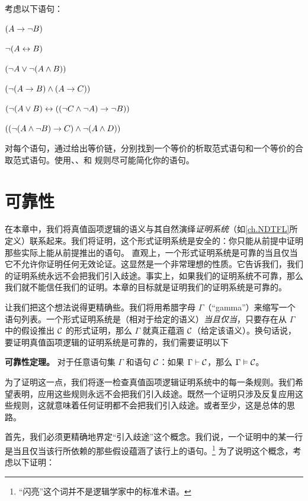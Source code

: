\practiceproblems
\problempart
\label{pr.DNF2}
考虑以下语句：


\begin{compactlist}
	\item $(A \rightarrow \neg B)$
	\item $\neg (A \leftrightarrow B)$
	\item $(\neg A \vee \neg (A \wedge B))$
	\item $(\neg (A \rightarrow B ) \wedge (A \rightarrow C))$
	\item $(\neg (A \vee B) \leftrightarrow ((\neg C \wedge \neg A) \rightarrow \neg B))$
	\item $((\neg (A \wedge \neg B) \rightarrow C) \wedge \neg (A \wedge D))$
\end{compactlist}


对每个语句，通过给出等价链，分别找到一个等价的析取范式语句和一个等价的合取范式语句。使用、、和 规则尽可能简化你的语句。

\chapter{可靠性}\label{ch:Soundness}

在本章中，我们将真值函项逻辑的语义与其自然演绎\emph{证明系统}（如\cref{ch.NDTFL}所定义）联系起来。我们将证明，这个形式证明系统是安全的：你只能从前提中证明那些实际上能从前提推出的语句。
直观上，一个形式证明系统是可靠的当且仅当它不允许你证明任何无效论证。这显然是一个非常理想的性质。它告诉我们，我们的证明系统永远不会把我们引入歧途。事实上，如果我们的证明系统不可靠，那么我们就不能信任我们的证明。本章的目标就是证明我们的证明系统是可靠的。

让我们把这个想法说得更精确些。我们将用希腊字母 $\Gamma$（“gamma”）来缩写一个语句列表。一个形式证明系统是（相对于给定的语义）\emph{当且仅当}，只要存在从 $\Gamma$ 中的假设推出 $\mathcal{C}$ 的形式证明，那么 $\Gamma$ 就真正蕴涵 $\mathcal{C}$（给定该语义）。换句话说，要证明真值函项逻辑的证明系统是可靠的，我们需要证明以下

\begin{factoidboxe}\textbf{可靠性定理。} 对于任意语句集 $\Gamma$ 和语句 $\mathcal{C}$：如果 $\Gamma\vdash\mathcal{C}$，那么 $\Gamma \vDash\mathcal{C}$。
\end{factoidboxe}

为了证明这一点，我们将逐一检查真值函项逻辑证明系统中的每一条规则。我们希望表明，应用这些规则永远不会把我们引入歧途。既然一个证明只涉及反复应用这些规则，这就意味着任何证明都不会把我们引入歧途。或者至少，这是总体的思路。

首先，我们必须更精确地界定“引入歧途”这个概念。我们说，一个证明中的某一行是当且仅当该行所依赖的那些假设蕴涵了该行上的语句。\footnote{“闪亮”这个词并不是逻辑学家中的标准术语。} 为了说明这个概念，考虑以下证明：


